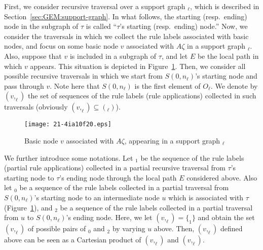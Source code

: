 \documentclass[english]{jnlp_1.4_rep}
\newcommand{\dto}{}
\newcommand{\win}{}
\newcommand{\rseq}{}
\newcommand{\trees}{}
\newcommand{\treesin}{}
\newcommand{\treesout}{}
\newcommand{\sg}{}
\begin{document}
First, we consider recursive traversal over
a support graph $\sg_\ell$,
which is described in Section~\ref{sec:GEM:support-graph}.
In what follows, the starting (resp.\ ending) node in
the subgraph of $\tau$ is called ``$\tau$'s starting (resp.\ ending) node.''
Now, we consider the traversals in which we collect the rule labels
associated with basic nodes, and focus on some basic node $v$
associated with $A\dto\zeta$ in a support graph $\sg_\ell$.
Also, suppose that $v$ is included in a subgraph of $\tau$,
and let $E$ be the local path in which $v$ appears.
This situation is depicted in Figure~\ref{fig:v-in-sg}.
Then, we consider all possible recursive traversals in which
we start from $S(0,n_\ell)$'s starting node and pass through $v$.
Note here that $S(0,n_\ell)$ is the first element of $O_\ell$.
We denote by $\trees(v,\win_\ell)$ the set of sequences of
the rule labels (rule applications) collected in such traversals
(obviously $\trees(v,\win_\ell)\subseteq\trees(\win_\ell)$).

\begin{figure}[b]
\begin{center}
\texttt{[image: 21-4ia10f20.eps]}
\end{center}
\caption{Basic node $v$ associated with $A\dto\zeta$, appearing in a support graph $\sg_\ell$}
\label{fig:v-in-sg}
\end{figure}

We further introduce some notations.  Let $\rseq_1$ be the sequence
of the rule labels (partial rule applications) collected
in a partial recursive traversal from $\tau$'s starting node to
$\tau$'s ending node through the local path $E$ considered above.
Also let $\rseq_0$ be a sequence of the rule labels
collected in a partial traversal from $S(0,n_\ell)$'s starting
node to an intermediate node $u$ which is associated with $\tau$
(Figure~\ref{fig:v-in-sg}), and $\rseq_2$ be a sequence of
the rule labels collected in a partial traversal from $u$
to $S(0,n_\ell)$'s ending node.
Here, we let $\treesin(v,\win_\ell)=\{\rseq_1\}$ and obtain
the set $\treesout(v,\win_\ell)$ of possible pairs of $\rseq_0$
and $\rseq_2$ by varying $u$ above.
Then, $\trees(v,\win_\ell)$ defined above can be seen as
a Cartesian product of $\treesin(v,\win_\ell)$ and
$\treesout(v,\win_\ell)$.
\end{document}
